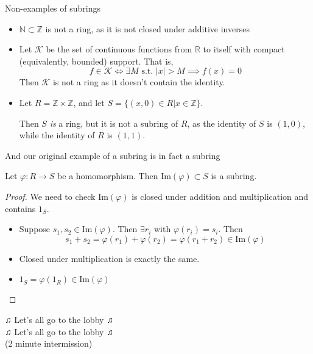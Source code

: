 \documentclass{beamer}
\begin{document}
\begin{frame}{Non-examples of subrings}

\begin{itemize}
\item $\mathbb{N}\subset\mathbb{Z}$ is not a ring, as it is not closed under additive inverses
\item Let $\mathcal{K}$ be the set of continuous functions from $\mathbb{R}$ to itself with compact (equivalently, bounded) support.  That is,
$$f\in \mathcal{K} \iff \exists M \textrm{ s.t. } |x|>M\implies  f(x)=0 $$
Then $\mathcal{K}$ is not a ring as it doesn't contain the identity.  
\item Let $R=\mathbb{Z}\times \mathbb{Z}$, and let $S=\{(x,0)\in R | x\in \mathbb{Z}\}$.  

Then $S$ \emph{is} a ring, but it is \alert{not} a subring of $R$, as the identity of $S$ is $(1,0)$, while the identity of $R$ is $(1,1)$.

\end{itemize}
\end{frame}

\begin{frame}{And our original example of a subring is in fact a subring}

\begin{lemma} Let $\varphi:R\to S$ be a homomorphism.  Then $\textrm{Im}(\varphi)\subset S$ is a subring.
\end{lemma}

\begin{proof}
We need to check $\textrm{Im}(\varphi)$ is closed under addition and multiplication and contains $1_S$.
\begin{itemize}
\item Suppose $s_1,s_2\in\textrm{Im}(\varphi)$.  Then $\exists r_i$ with $\varphi(r_i)=s_i$.  Then
$$s_1+s_2=\varphi(r_1)+\varphi(r_2)=\varphi(r_1+r_2)\in\textrm{Im}(\varphi)$$
\item Closed under multiplication is exactly the same.
\item $1_S=\varphi(1_R)\in\textrm{Im}(\varphi)$
\end{itemize}

\end{proof}

\end{frame}

\begin{frame}[plain,c]

\begin{center}

\Huge

$\twonotes$ Let's all go to the lobby $\twonotes$ \\ $\twonotes$ Let's all go to the lobby $\twonotes$ \\
(2 minute intermission)
\end{center}

\end{frame}
\end{document}
